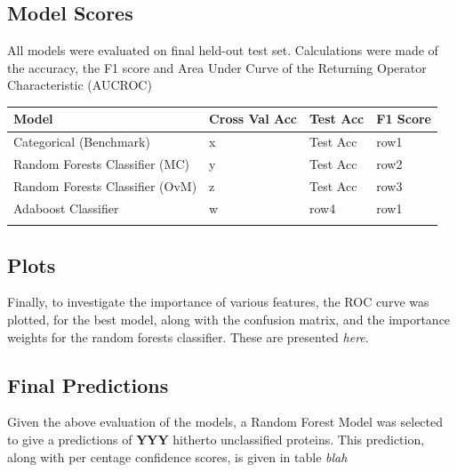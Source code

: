 \documentclass{bioinfo}
\begin{document}
\subsection{Model Scores}

All models were evaluated on final held-out test set. Calculations were made of the accuracy, the F1 score and Area Under Curve of the Returning Operator Characteristic (AUCROC)

\begin{table}[!h]
 {\begin{tabular}{@{}llll@{}}\toprule Model  & Cross Val Acc & Test Acc &F1 Score \\\midrule
Categorical (Benchmark) & x & Test Acc &row1  \\
Random Forests Classifier (MC) & y &  Test Acc &row2 \\
Random Forests Classifier (OvM)& z &  Test Acc &row3 \\
Adaboost Classifier & w & row4 & row1\\\botrule
\end{tabular}}{}
\end{table}

\subsection{Plots}

Finally, to investigate the importance of various features, the ROC curve was plotted, for the best model, along with the confusion matrix, and the importance weights for the random forests classifier. These are presented \textit{here}.


\subsection{Final Predictions}

Given the above evaluation of the models, a Random Forest Model was selected to give a predictions of \textbf{YYY} hitherto unclassified proteins. This prediction, along with per centage confidence scores, is given in table \textit{blah}
\end{document}
